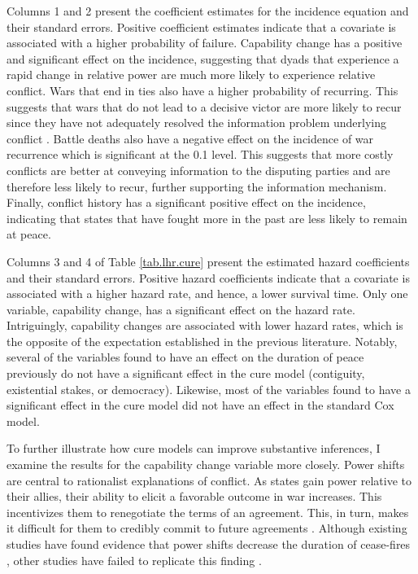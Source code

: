 Columns 1 and 2 present the coefficient estimates for the incidence equation and their standard errors. Positive coefficient estimates indicate that a covariate is associated with a higher probability of failure. Capability change has a positive and significant effect on the incidence, suggesting that dyads that experience a rapid change in relative power are much more likely to experience relative conflict. Wars that end in ties also have a higher probability of recurring. This suggests that wars that do not lead to a decisive victor are more likely to recur since they have not adequately resolved the information problem underlying conflict \citep{fearon1995}. Battle deaths also have a negative effect on the incidence of war recurrence which is significant at the 0.1 level. This suggests that more costly conflicts are better at conveying information to the disputing parties and are therefore less likely to recur, further supporting the information mechanism. Finally, conflict history has a significant positive effect on the incidence, indicating that states that have fought more in the past are less likely to remain at peace.

Columns 3 and 4 of Table \ref{tab.lhr.cure} present the estimated hazard coefficients and their standard errors. Positive hazard coefficients indicate that a covariate is associated with a higher hazard rate, and hence, a lower survival time. Only one variable, capability change, has a significant effect on the hazard rate. Intriguingly, capability changes are associated with lower hazard rates, which is the opposite of the expectation established in the previous literature. Notably, several of the variables found to have an effect on the duration of peace previously do not have a significant effect in the cure model (contiguity, existential stakes, or democracy). Likewise, most of the variables found to have a significant effect in the cure model did not have an effect in the standard Cox model.

To further illustrate how cure models can improve substantive inferences, I examine the results for the capability change variable more closely. 
Power shifts are central to rationalist explanations of conflict. As states gain power relative to their allies, their ability to elicit a favorable outcome in war increases. This incentivizes them to renegotiate the terms of an agreement. This, in turn, makes it difficult for them to credibly commit to future agreements \citep{fearon1995, powell2006}. Although existing studies have found evidence that power shifts decrease the duration of cease-fires \citep{werner1999, werner2005}, other studies have failed to replicate this finding \citep{fortna2003, lo2008}.

